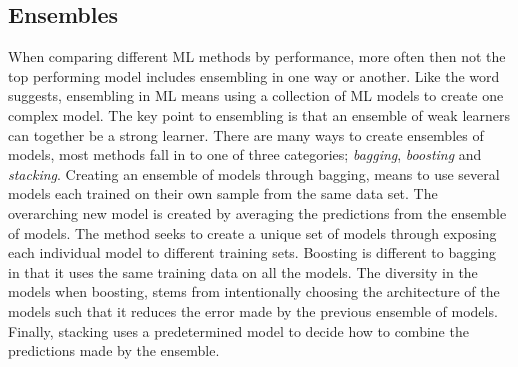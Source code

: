 \subsection{Ensembles}\label{subsec:Ensembles}
When comparing different \ac{ML} methods by performance, more often then not the top performing model includes 
ensembling in one way or another. Like the word suggests, ensembling in \ac{ML} means using a collection of 
\ac{ML} models to create one complex model. The key point to ensembling is that an ensemble of weak learners 
can together be a strong learner. There are many ways to create ensembles of models, most methods 
fall in to one of three categories; \emph{bagging}, \emph{boosting} and \emph{stacking}. Creating an ensemble of models 
through bagging, means to use several models each trained on their own sample from the same data set. The overarching 
new model is created by averaging the predictions from the ensemble of models. The method seeks to create a unique set of 
models through exposing each individual model to different training sets. Boosting is different to bagging in that it uses 
the same training data on all the models. The diversity in the models when boosting, stems from intentionally choosing the 
architecture of the models such that it reduces the error made by the previous ensemble of models. Finally, stacking uses 
a predetermined model to decide how to combine the predictions made by the ensemble. 
